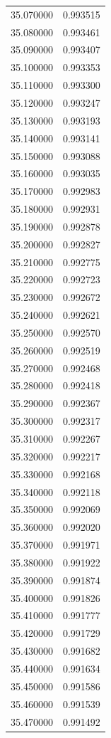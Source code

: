 \begin{tabular}{rr}
35.070000 & 0.993515 \\
35.080000 & 0.993461 \\
35.090000 & 0.993407 \\
35.100000 & 0.993353 \\
35.110000 & 0.993300 \\
35.120000 & 0.993247 \\
35.130000 & 0.993193 \\
35.140000 & 0.993141 \\
35.150000 & 0.993088 \\
35.160000 & 0.993035 \\
35.170000 & 0.992983 \\
35.180000 & 0.992931 \\
35.190000 & 0.992878 \\
35.200000 & 0.992827 \\
35.210000 & 0.992775 \\
35.220000 & 0.992723 \\
35.230000 & 0.992672 \\
35.240000 & 0.992621 \\
35.250000 & 0.992570 \\
35.260000 & 0.992519 \\
35.270000 & 0.992468 \\
35.280000 & 0.992418 \\
35.290000 & 0.992367 \\
35.300000 & 0.992317 \\
35.310000 & 0.992267 \\
35.320000 & 0.992217 \\
35.330000 & 0.992168 \\
35.340000 & 0.992118 \\
35.350000 & 0.992069 \\
35.360000 & 0.992020 \\
35.370000 & 0.991971 \\
35.380000 & 0.991922 \\
35.390000 & 0.991874 \\
35.400000 & 0.991826 \\
35.410000 & 0.991777 \\
35.420000 & 0.991729 \\
35.430000 & 0.991682 \\
35.440000 & 0.991634 \\
35.450000 & 0.991586 \\
35.460000 & 0.991539 \\
35.470000 & 0.991492 \\

\end{tabular}
